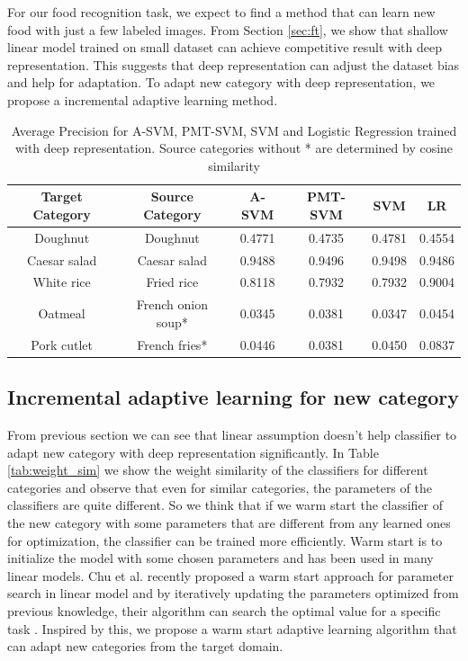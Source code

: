 For our food recognition task, we expect to find a method that can learn new food with just a few labeled images. From Section \ref{sec:ft}, we show that shallow linear model trained on small dataset can achieve competitive result with deep representation. This suggests that deep representation can adjust the dataset bias and help for adaptation. To adapt new category with deep representation, we propose a incremental adaptive learning method.
\begin{table}[htbp]
  \centering
  \caption{Average Precision for A-SVM, PMT-SVM, SVM and Logistic Regression trained with deep representation. Source categories without * are determined by cosine similarity}
    \begin{tabular}{cccccc}
    \toprule
    Target Category & Source Category & A-SVM  & PMT-SVM & SVM &LR\\
    \midrule
    Doughnut & Doughnut & 0.4771 & 0.4735 &0.4781&0.4554\\
    Caesar salad &  Caesar salad & 0.9488 & 0.9496 &0.9498&0.9486\\
    White rice  & Fried rice & 0.8118 & 0.7932 &0.7932&0.9004\\
    Oatmeal & French onion soup* & 0.0345 & 0.0381 & 0.0347 &0.0454\\
    Pork cutlet & French fries* & 0.0446 & 0.0381 &0.0450& 0.0837\\
    \bottomrule
    \end{tabular}%
  \label{tab:su_domian}%
\end{table}%

\subsection{Incremental adaptive learning for new category}
From previous section we can see that linear assumption doesn't help classifier to adapt new category with deep representation significantly.
In Table \ref{tab:weight_sim} we show the weight similarity of the classifiers for different categories and observe that even for similar categories, the parameters of the classifiers are quite different. So we think that if we warm start the classifier of the new category with some parameters that are different from any learned ones for optimization, the classifier can be trained more efficiently. Warm start is to initialize the model with some chosen parameters and has been used in many linear models.
Chu et al. recently proposed a warm start approach for parameter search in linear model and by iteratively updating the parameters optimized from previous knowledge, their algorithm can search the optimal value for a specific task \cite{chuwarm}. Inspired by this, we propose a warm start adaptive learning algorithm that can adapt new categories from the target domain.%

